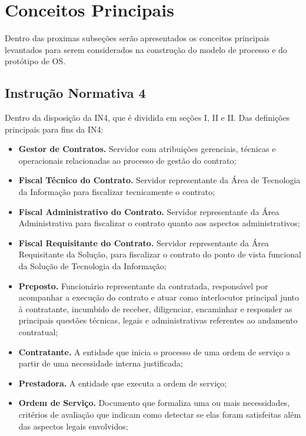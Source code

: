 \section{Conceitos Principais}

Dentro das proximas subseções serão apresentados os conceitos principais
levantados para serem considerados na construção do modelo de processo
e do protótipo de OS.

\subsection{Instrução Normativa 4}

Dentro da disposição da IN4, que é dividida em seções I, II e II.
Das definições principais para fins da IN4:
\begin{itemize}
  \item \textbf{Gestor de Contratos.} Servidor com atribuições gerenciais,
  técnicas e operacionais relacionadas ao processo de gestão do contrato;
  \item \textbf{Fiscal Técnico do Contrato.} Servidor representante da Área de
  Tecnologia da Informação para fiscalizar tecnicamente o contrato;
  \item \textbf{Fiscal Administrativo do Contrato.} Servidor representante da
  Área Administrativa para fiscalizar o contrato quanto aos aspectos
  administrativos;
  \item \textbf{Fiscal Requisitante do Contrato.} Servidor representante da
  Área Requisitante da Solução, para fiscalizar o contrato do ponto de vista
  funcional da Solução de Tecnologia da Informação;
  \item \textbf{Preposto.} Funcionário representante da contratada,
  responsável por acompanhar a execução do contrato e atuar como interlocutor
  principal junto à contratante, incumbido de receber, diligenciar, encaminhar
  e responder as principais questões técnicas, legais e administrativas
  referentes ao andamento contratual;
  \item \textbf{Contratante.} A entidade que inicia o processo de uma ordem de
  serviço a partir de uma necessidade interna justificada;
  \item \textbf{Prestadora.} A entidade que executa a ordem de serviço;
  \item \textbf{Ordem de Serviço.} Documento que formaliza uma ou mais
  necessidades, critérios de avaliação que indicam como detectar se elas foram
  satisfeitas além das aspectos legais envolvidos;
\end{itemize}

